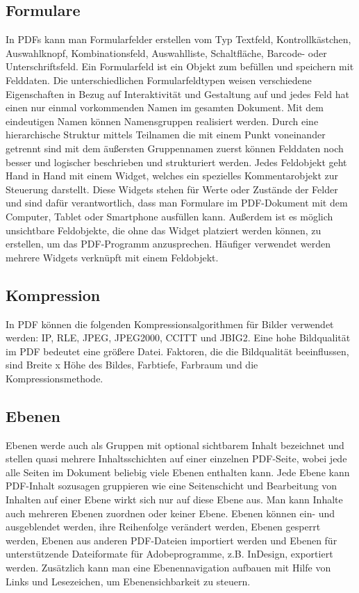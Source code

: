 \subsection{Formulare}
In PDFs kann man Formularfelder erstellen vom Typ Textfeld, Kontrollkästchen, Auswahlknopf, Kombinationsfeld, Auswahlliste, Schaltfläche, Barcode- oder
Unterschriftsfeld. Ein Formularfeld ist ein Objekt zum befüllen und speichern mit Felddaten. Die unterschiedlichen Formularfeldtypen weisen verschiedene Eigenschaften in Bezug auf Interaktivität und Gestaltung auf und jedes Feld hat einen nur einmal vorkommenden Namen im gesamten Dokument. Mit dem eindeutigen Namen können Namensgruppen realisiert werden. Durch eine hierarchische Struktur mittels Teilnamen die mit einem Punkt voneinander getrennt sind mit dem äußersten Gruppennamen zuerst können Felddaten noch besser und logischer beschrieben und strukturiert werden. Jedes Feldobjekt geht Hand in Hand mit einem Widget, welches ein spezielles Kommentarobjekt zur Steuerung darstellt. Diese Widgets stehen für Werte oder Zustände der Felder und sind dafür verantwortlich, dass man Formulare im PDF-Dokument mit dem Computer, Tablet oder Smartphone ausfüllen kann. Außerdem ist es möglich unsichtbare Feldobjekte, die ohne das Widget platziert werden können, zu erstellen, um das PDF-Programm anzusprechen. Häufiger verwendet werden mehrere Widgets verknüpft mit einem Feldobjekt.
\cite{softx}

\subsection{Kompression}
In PDF können die folgenden Kompressionsalgorithmen für Bilder verwendet werden: IP, RLE, JPEG, JPEG2000, CCITT und JBIG2. Eine hohe Bildqualität im PDF bedeutet eine größere Datei. Faktoren, die die Bildqualität beeinflussen, sind Breite x Höhe des Bildes, Farbtiefe, Farbraum und die Kompressionsmethode.
\cite{softx}

\subsection{Ebenen}
Ebenen werde auch als Gruppen mit optional sichtbarem Inhalt bezeichnet und stellen quasi mehrere Inhaltsschichten auf einer einzelnen PDF-Seite, wobei jede alle Seiten im Dokument beliebig viele Ebenen enthalten kann. Jede Ebene kann PDF-Inhalt sozusagen gruppieren wie eine Seitenschicht und Bearbeitung von Inhalten auf einer Ebene wirkt sich nur auf diese Ebene aus. Man kann Inhalte auch mehreren Ebenen zuordnen oder keiner Ebene. Ebenen können ein- und ausgeblendet werden, ihre Reihenfolge verändert werden, Ebenen gesperrt werden, Ebenen aus anderen PDF-Dateien importiert werden und Ebenen für unterstützende Dateiformate für Adobeprogramme, z.B. InDesign, exportiert werden. Zusätzlich kann man eine Ebenennavigation aufbauen mit Hilfe von Links und Lesezeichen, um Ebenensichbarkeit zu steuern. \cite{adobe-ebenen}

